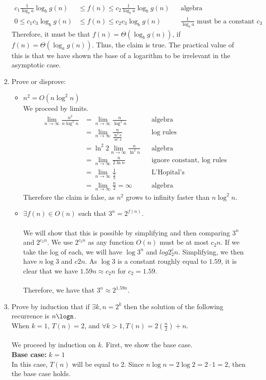 \documentclass{article}
\begin{document}
\begin{enumerate}
\begin{align}
	    c_1 \frac{1}{\log_b a} \log_b g(n) &\leq f(n) \leq c_2 \frac{1}{\log_b a} \log_b g(n) && \text{algebra} \\
	   0 \leq c_1 c_3 \log_b g(n) &\leq f(n) \leq c_2 c_3 \log_b g(n) && \text{$\frac{1}{\log_b a}$ must be a constant $c_3$} 
	\end{align}
	Therefore, it must be that $f(n)= \Theta (\log_b g(n))$, if $f(n)= \Theta (\log_a g(n))$. Thus, the claim is true. The practical value of this is that we have shown the base of a logarithm to be irrelevant in the asymptotic case.
	\item Prove or disprove:
	\begin{itemize}
	    \item $n^2 = O(n \log^2 n)$
	    \\ We proceed by limits.
	    \begin{align}
	        \lim_{n\to\infty} \frac{n^2}{n \log^2 n} &= \lim_{n\to\infty} \frac{n}{\log^2 n}  && \text{algebra} \\
	        &= \lim_{n\to\infty} \frac{n}{\frac{\ln^2 n}{\ln^2 2}} && \text{log rules} \\
	        &= \ln^2 2 \lim_{n\to\infty} \frac{n}{\ln^2 n} && \text{algebra} \\
	        &= \lim_{n\to\infty} \frac{n}{2\ln  n} && \text{ignore constant, log rules} \\
	        &= \lim_{n\to\infty} \frac{1}{\frac{2}{n}} && \text{L'Hopital's} \\
	        &= \lim_{n\to\infty} \frac{n}{2} = \infty && \text{algebra}
	    \end{align}
	    Therefore the claim is false, as $n^2$ grows to infinity faster than $n \log^2 n$.
	    \item $ \exists f(n) \in O(n)$ such that $ 3^n = 2^{f(n)}$.
	   \\ \\ We will show that this is possible by simplifying and then comparing $3^n$ and $2^{c_2 n}$. We use $2^{c_2 n}$ as any function $O(n)$ must be at most $c_2n$. If we take the log of each, we will have $\log3^n$ and $log2^c_2n$. Simplifying, we then have $n\log3$ and $c2n$. As $\log 3$ is a constant roughly equal to $1.59$, it is clear that we have $1.59 n \approx c_2n$ for $c_2=1.59$.
	   \\ \\ Therefore, we have that $3^n \approx 2^{1.59n}$.
	   \end{itemize}
	   \item Prove by induction that if $\exists k, n = 2^k$ then the solution of the following recurrence is $n\logn$.
	   \\ When $k=1$, $T(n)=2$, and $\forall k>1, T(n) = 2(\frac{n}{2})+n$.
	   \\ \\ We proceed by induction on $k$. First, we show the base case.
	   \\ \textbf{Base case:} $k=1$
	   \\ In this case, $T(n)$ will be equal to 2. Since $n\log n=2\log 2=2\cdot 1=2$, then the base case holds.
	   

\end{enumerate}
\end{document}
